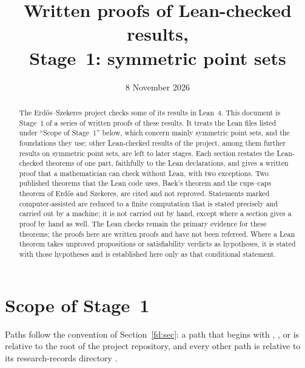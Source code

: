 \documentclass[10pt]{amsart}
\title[Written proofs of Lean-checked results, Stage~1: symmetric point sets]{Written proofs of Lean-checked
  results,\\ Stage~1: symmetric point sets}
\date{8 November 2026}
\begin{document}
\begin{abstract}
The Erd\H{o}s--Szekeres project checks some of its results in Lean~4. This document is Stage~1 of a series of written
proofs of these results. It treats the Lean files listed under ``Scope of Stage~1'' below, which concern mainly
symmetric point sets, and the foundations they use; other Lean-checked results of the project, among them further
results on symmetric point sets, are left to later stages. Each section restates the Lean-checked theorems of one
part, faithfully to the Lean declarations, and gives a written proof that a mathematician can check without Lean,
with two exceptions. Two published theorems that the Lean code uses, Baek's theorem and the cups--caps theorem of
Erd\H{o}s and Szekeres, are cited and not reproved. Statements marked computer-assisted are reduced to a finite
computation that is stated precisely and carried out by a machine; it is not carried out by hand, except where a
section gives a proof by hand as well. The Lean checks remain the primary evidence for these theorems; the proofs
here are written proofs and have not been refereed. Where a Lean theorem takes unproved propositions or
satisfiability verdicts as hypotheses, it is stated with those hypotheses and is established here only as that
conditional statement.
\end{abstract}

\maketitle
\tableofcontents

\section*{Scope of Stage~1}

Paths follow the convention of Section~\ref{fd:sec}: a path that begins with , ,
 or  is relative to the root of the project repository, and every other path is
relative to its research-records directory .
\end{document}
